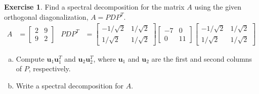 \documentclass[10pt]{book}
\theoremstyle{definition}
\newtheorem{exercise}{Exercise}[section]
\newcommand{\name}[1][2.5in]{\vspace{-2.3em}\hfill Name: \underline{\hspace{#1}}}
\newcommand{\vect}[1]{\ensuremath{\boldsymbol{\mathbf{#1}}}}
\begin{document}
\begin{exercise} %
	Find a spectral decomposition for the matrix $A$ using the given orthogonal diagonalization, $A=PDP^T$.
	\begin{align*}
	A &= \begin{bmatrix}2&9\\9&2\end{bmatrix} &
	PDP^T &= 
	\begin{bmatrix}-1/\sqrt{2}&1/\sqrt{2}\\1/\sqrt{2}&1/\sqrt{2}\end{bmatrix}
	\begin{bmatrix}-7&0\\0&11\end{bmatrix}
	\begin{bmatrix}-1/\sqrt{2}&1/\sqrt{2}\\1/\sqrt{2}&1/\sqrt{2}\end{bmatrix}
	\end{align*}
	\begin{enumerate}[(a)]
		\item Compute $\vect{u}_1\vect{u}_1^T$ and $\vect{u}_2\vect{u}_2^T$, where $\vect{u}_1$ and $\vect{u}_2$ are the first and second columns of $P$, respectively.
		\vspace{1in}
		\item Write a spectral decomposition for $A$.
		\vspace{3em}
	\end{enumerate}
\end{exercise}


%
%
%
%
%
%
%
%
%
%
%
%
%
%
%
%
%
%
%
%
%
%
%
%
\end{document}
